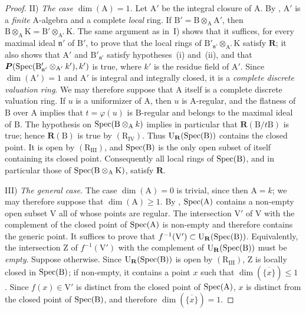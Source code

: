 \begin{proof}
II) \emph{The case $\dim(\mathrm{A})=1$.} Let $\mathrm{A}'$ be the integral closure of $\mathrm{A}$. By , $\mathrm{A}'$ is a \emph{finite} $\mathrm{A}$-algebra and a complete \emph{local} ring. If $\mathrm{B}'=\mathrm{B}\otimes_\mathrm{A}\mathrm{A}'$, then $\mathrm{B}\otimes_\mathrm{A}\mathrm{K}=\mathrm{B}'\otimes_{\mathrm{A}'}\mathrm{K}$.
The same argument as in~I) shows that it suffices, for every maximal ideal $\mathfrak{n}'$ of $\mathrm{B}'$, to prove that the local rings of $\mathrm{B}'_{\mathfrak{n}'}\otimes_{\mathrm{A}'}\mathrm{K}$ satisfy $\boldsymbol{R}$; it also shows that $\mathrm{A}'$ and $\mathrm{B}'_{\mathfrak{n}'}$ satisfy hypotheses~(i) and~(ii), and that $\boldsymbol{P}(\operatorname{Spec}(\mathrm{B}'_{\mathfrak{n}'}\otimes_{\mathrm{A}'}k'),k')$
is true, where $k'$ is the residue field of $\mathrm{A}'$. Since $\dim(\mathrm{A}')=1$  and $\mathrm{A}'$ is integral and integrally closed, it is a \emph{complete discrete valuation ring}. We may therefore suppose that $\mathrm{A}$ itself is a complete discrete valuation ring. If $u$ is a uniformizer of $\mathrm{A}$, then $u$ is $\mathrm{A}$-regular, and the flatness of $\mathrm{B}$ over $\mathrm{A}$ implies that $t=\varphi(u)$ is $\mathrm{B}$-regular and belongs to the maximal ideal of $\mathrm{B}$. The hypothesis on $\operatorname{Spec}(\mathrm{B}\otimes_\mathrm{A}k)$ implies in particular that $\boldsymbol{R}(\mathrm{B}/t\mathrm{B})$ is true; hence $\boldsymbol{R}(\mathrm{B})$ is true by $(\mathrm{R}_{\mathrm{IV}})$. Thus $\mathrm{U}_{\mathbf{R}}(\operatorname{Spec}(\mathrm{B}))$ contains the closed point. It is open by $(\mathrm{R}_{\mathrm{III}})$, and $\operatorname{Spec}(\mathrm{B})$ is the only open subset of itself containing its closed point. Consequently all local rings of $\operatorname{Spec}(\mathrm{B})$, and in particular those of $\operatorname{Spec}(\mathrm{B}\otimes_\mathrm{A}\mathrm{K})$, satisfy $\boldsymbol{R}$.

III) \emph{The general case.} The case $\dim(\mathrm{A})=0$ is trivial, since then $\mathrm{A}=k$; we may therefore suppose that $\dim(\mathrm{A})\geqslant1$. By , $\operatorname{Spec}(\mathrm{A})$ contains a non-empty open subset $\mathrm{V}$ all of whose points are regular. The intersection $\mathrm{V}'$ of $\mathrm{V}$ with the complement of the closed point of $\operatorname{Spec}(\mathrm{A})$ is non-empty and therefore contains the generic point. It suffices to prove that $f^{-1}(\mathrm{V}')\subset\mathrm{U}_{\mathbf{R}}(\operatorname{Spec}(\mathrm{B}))$.
Equivalently, the intersection $\mathrm{Z}$ of $f^{-1}(\mathrm{V}')$ with the complement of $\mathrm{U}_{\mathbf{R}}(\operatorname{Spec}(\mathrm{B}))$ must be \emph{empty}. Suppose otherwise. Since $\mathrm{U}_{\mathbf{R}}(\operatorname{Spec}(\mathrm{B}))$ is open by $(\mathrm{R}_{\mathrm{III}})$, $\mathrm{Z}$ is locally closed in $\operatorname{Spec}(\mathrm{B})$; if non-empty, it contains a point $x$ such that $\dim(\overline{\{x\}})\leqslant1$ . Since $f(x)\in\mathrm{V}'$ is distinct from the closed point of $\operatorname{Spec}(\mathrm{A})$, $x$ is distinct from the closed point of $\operatorname{Spec}(\mathrm{B})$, and therefore $\dim(\overline{\{x\}})=1$.


\end{proof}
